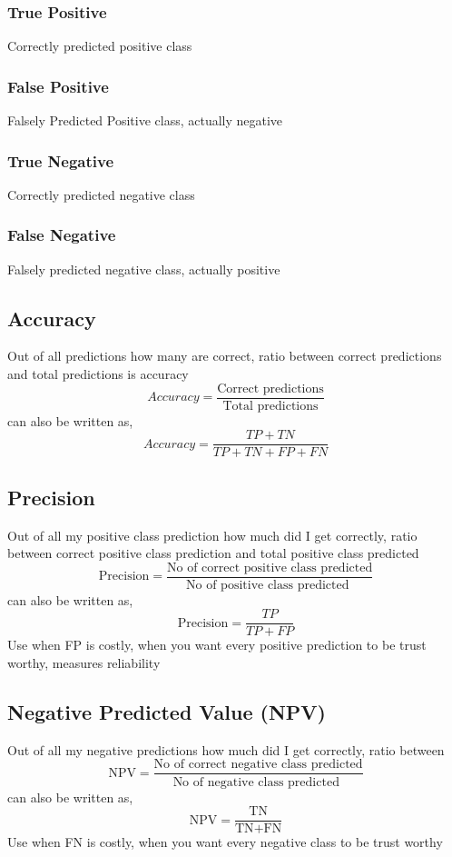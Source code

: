 \documentclass[12pt]{extarticle}
\begin{document}
\subsubsection{True Positive}
Correctly predicted positive class

\subsubsection{False Positive}
Falsely Predicted Positive class, actually negative

\subsubsection{True Negative}
Correctly predicted negative class

\subsubsection{False Negative}
Falsely predicted negative class, actually positive 

\subsection{Accuracy}
Out of all predictions how many are correct, 
ratio between correct predictions and total predictions is accuracy
$$ Accuracy = \frac{\text{Correct predictions}} {\text{Total predictions}} $$
can also be written as,
$$ Accuracy = \frac{TP+TN}{TP+TN+FP+FN}  $$

\subsection{Precision}
Out of all my positive class prediction how much did I get correctly, 
ratio between correct positive class prediction and total positive class predicted
$$ \text{Precision} = \frac{\text{No of correct positive class predicted}}{\text{No of positive class predicted }} $$
can also be written as,
$$\text{Precision} = \frac{TP}{TP+FP}$$
Use when FP is costly, when you want every positive prediction to be trust worthy, measures reliability

\subsection{Negative Predicted Value (NPV)}
Out of all my negative predictions how much did I get correctly, 
ratio between
$$ \text{NPV} = \frac{\text{No of correct negative class predicted}}{\text{No of negative class predicted }} $$
can also be written as,
$$\text{NPV} = \frac{\text{TN}}{\text{TN} + \text{FN}}$$
Use when FN is costly, when you want every negative class to be trust worthy
\end{document}
